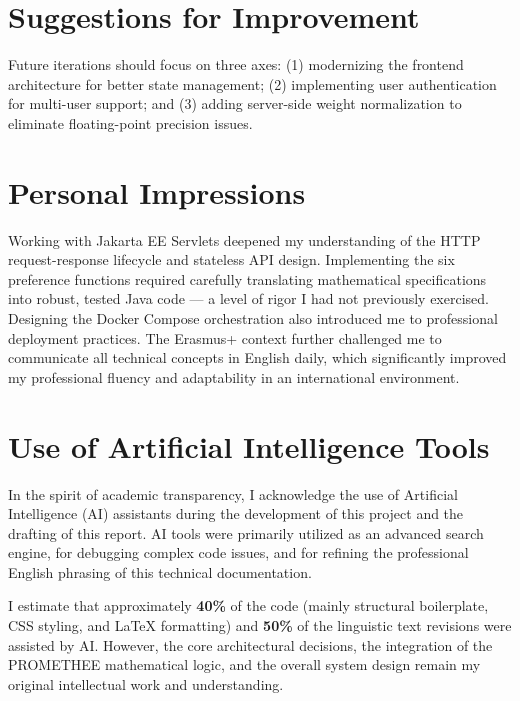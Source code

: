 \documentclass[12pt,a4paper,oneside]{report}
\begin{document}
\section{Suggestions for Improvement}
Future iterations should focus on three axes: 
(1) modernizing the frontend architecture for better state management; 
(2) implementing user authentication for multi-user support; and
(3) adding server-side weight normalization to eliminate floating-point precision issues.

\section{Personal Impressions}
Working with Jakarta EE Servlets deepened my understanding of the HTTP request-response lifecycle and stateless API design. Implementing the six preference functions required carefully translating mathematical specifications into robust, tested Java code --- a level of rigor I had not previously exercised. Designing the Docker Compose orchestration also introduced me to professional deployment practices. The Erasmus+ context further challenged me to communicate all technical concepts in English daily, which significantly improved my professional fluency and adaptability in an international environment.

\section{Use of Artificial Intelligence Tools}
In the spirit of academic transparency, I acknowledge the use of Artificial Intelligence (AI) assistants during the development of this project and the drafting of this report. AI tools were primarily utilized as an advanced search engine, for debugging complex code issues, and for refining the professional English phrasing of this technical documentation. 

I estimate that approximately \textbf{40\%} of the code (mainly structural boilerplate, CSS styling, and LaTeX formatting) and \textbf{50\%} of the linguistic text revisions were assisted by AI. However, the core architectural decisions, the integration of the PROMETHEE mathematical logic, and the overall system design remain my original intellectual work and understanding.

\end{document}

